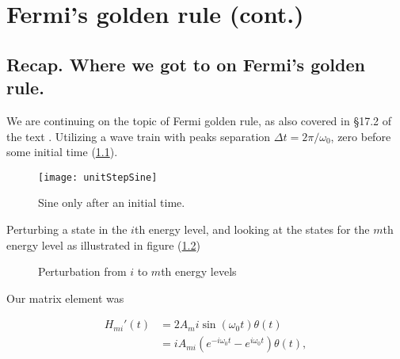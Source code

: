 %
%

\chapter{Fermi's golden rule (cont.)}
\label{chap:qmTwoL10}
{}
\date{Oct 10, 2011}

\beginArtWithToc

%

\section{Recap. Where we got to on Fermi's golden rule.}

We are continuing on the topic of Fermi golden rule, as also covered in \S 17.2 of the text \cite{desai2009quantum}.  Utilizing a wave train with peaks separation $\Delta t = 2\pi/\omega_0$, zero before some initial time (\ref{fig:qmTwoL10:unitStepSine}).

\begin{figure}[htp]
   \centering
   \texttt{[image: unitStepSine]}
   \caption{Sine only after an initial time.}\label{fig:qmTwoL10:unitStepSine}
\end{figure}

Perturbing a state in the $i$th energy level, and looking at the states for the $m$th energy level as illustrated in figure (\ref{fig:qmTwoL10:2})

\begin{figure}[htp]
   \centering
   \def\svgwidth{0.3\columnwidth}
   
   \caption{Perturbation from $i$ to $m$th energy levels}\label{fig:qmTwoL10:2}
\end{figure}

Our matrix element was

\begin{equation}\label{eqn:qmTwoL10:10}
\begin{aligned}
H_{mi}'(t) 
&= 2 A_mi \sin(\omega_0 t) \theta(t) \\
&= i A_{mi} ( e^{-i \omega_0 t} - e^{i \omega_0 t} ) \theta(t),
\end{aligned}
\end{equation}

